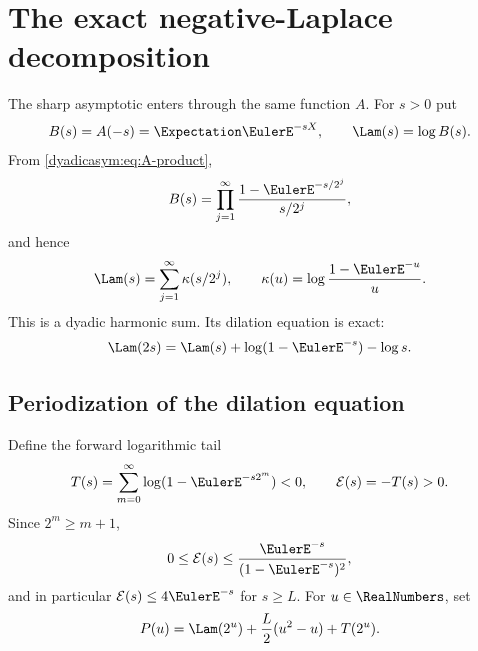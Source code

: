 \documentclass[11pt,oneside]{article}
\theoremstyle{definition}
\theoremstyle{remark}
\begin{document}
\section{The exact negative-Laplace decomposition}
\label{dyadicasym:sec:laplace-product}

The sharp asymptotic enters through the same function $A$.  For $s>0$ put
\begin{equation}
 B(s)=A(-s)=\Expectation\EulerE^{-sX},
 \qquad
 \Lam(s)=\log B(s).                                         \label{dyadicasym:eq:B-Lambda}
\end{equation}
From \eqref{dyadicasym:eq:A-product},
\begin{equation}
 B(s)=\prod_{j=1}^{\infty}
 \frac{1-\EulerE^{-s/2^j}}{s/2^j},                               \label{dyadicasym:eq:B-product}
\end{equation}
and hence
\begin{equation}
 \Lam(s)=\sum_{j=1}^{\infty}\kappa(s/2^j),
 \qquad
 \kappa(u)=\log\frac{1-\EulerE^{-u}}u.                          \label{dyadicasym:eq:Lambda-harmonic}
\end{equation}
This is a dyadic harmonic sum.  Its dilation equation is exact:
\begin{equation}
 \Lam(2s)=\Lam(s)+\log(1-\EulerE^{-s})-\log s.                  \label{dyadicasym:eq:Lambda-dilation}
\end{equation}

\subsection{Periodization of the dilation equation}

Define the forward logarithmic tail
\begin{equation}
 T(s)=\sum_{m=0}^{\infty}\log(1-\EulerE^{-s2^m})<0,
 \qquad
 \mathcal E(s)=-T(s)>0.                                    \label{dyadicasym:eq:tail}
\end{equation}
Since $2^m\ge m+1$,
\begin{equation}
 0\le\mathcal E(s)\le
 \frac{\EulerE^{-s}}{(1-\EulerE^{-s})^2},                            \label{dyadicasym:eq:tail-bound-report}
\end{equation}
and in particular $\mathcal E(s)\le4\EulerE^{-s}$ for $s\ge L$.
For $u\in\RealNumbers$, set
\begin{equation}
 P(u)=\Lam(2^u)+\frac L2(u^2-u)+T(2^u).                    \label{dyadicasym:eq:P-report}
\end{equation}
\end{document}
